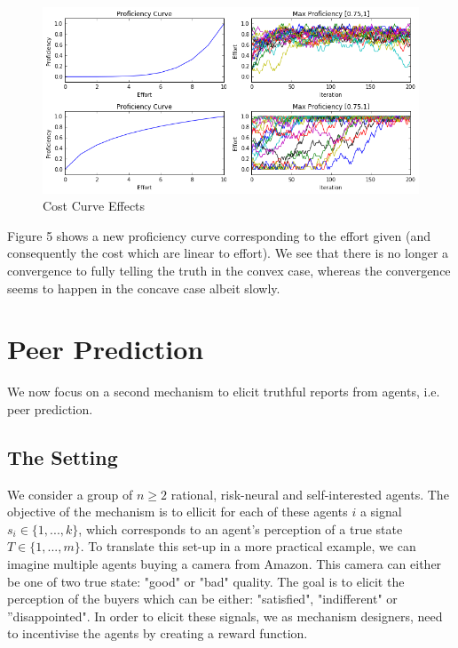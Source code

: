 \documentclass{scrartcl}
\begin{document}
 \begin{figure}[H]
	\caption{Cost Curve Effects}
	\centering
	\includegraphics[width=1.0\textwidth]{cost_curves}
\end{figure}

Figure 5 shows a new proficiency curve corresponding to the effort given (and consequently the cost which are linear to effort). We see that there is no longer a convergence to fully telling the truth in the convex case, whereas the convergence seems to happen in the concave case albeit slowly.

\section{Peer Prediction}

We now focus on a second mechanism to elicit truthful reports from agents, i.e. peer prediction. 

\subsection{The Setting}

We consider a group of $n\geq2$ rational, risk-neural and self-interested agents. The objective of the mechanism is to ellicit for each of these agents $i$ a signal $s_i \in \{1,..., k\}$, which corresponds to an agent's perception of a true state $T \in \{1, ..., m\}$. To translate this set-up in a more practical example, we can imagine multiple agents buying a camera from Amazon. This camera can either be one of two true state: "good" or "bad" quality. The goal is to elicit the perception of the buyers which can be either: "satisfied", "indifferent" or ''disappointed". In order to elicit these signals, we as mechanism designers, need to incentivise the agents by creating a reward function.\\
\end{document}
